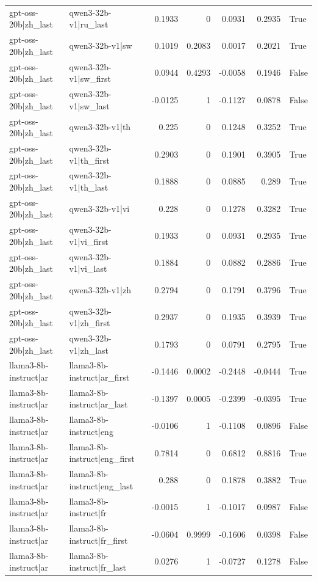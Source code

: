 \begin{table}
\begin{tabular}{l l r r r r l}
gpt-oss-20b|zh_last & qwen3-32b-v1|ru_last & 0.1933 & 0 & 0.0931 & 0.2935 & True \\
gpt-oss-20b|zh_last & qwen3-32b-v1|sw & 0.1019 & 0.2083 & 0.0017 & 0.2021 & True \\
gpt-oss-20b|zh_last & qwen3-32b-v1|sw_first & 0.0944 & 0.4293 & -0.0058 & 0.1946 & False \\
gpt-oss-20b|zh_last & qwen3-32b-v1|sw_last & -0.0125 & 1 & -0.1127 & 0.0878 & False \\
gpt-oss-20b|zh_last & qwen3-32b-v1|th & 0.225 & 0 & 0.1248 & 0.3252 & True \\
gpt-oss-20b|zh_last & qwen3-32b-v1|th_first & 0.2903 & 0 & 0.1901 & 0.3905 & True \\
gpt-oss-20b|zh_last & qwen3-32b-v1|th_last & 0.1888 & 0 & 0.0885 & 0.289 & True \\
gpt-oss-20b|zh_last & qwen3-32b-v1|vi & 0.228 & 0 & 0.1278 & 0.3282 & True \\
gpt-oss-20b|zh_last & qwen3-32b-v1|vi_first & 0.1933 & 0 & 0.0931 & 0.2935 & True \\
gpt-oss-20b|zh_last & qwen3-32b-v1|vi_last & 0.1884 & 0 & 0.0882 & 0.2886 & True \\
gpt-oss-20b|zh_last & qwen3-32b-v1|zh & 0.2794 & 0 & 0.1791 & 0.3796 & True \\
gpt-oss-20b|zh_last & qwen3-32b-v1|zh_first & 0.2937 & 0 & 0.1935 & 0.3939 & True \\
gpt-oss-20b|zh_last & qwen3-32b-v1|zh_last & 0.1793 & 0 & 0.0791 & 0.2795 & True \\
llama3-8b-instruct|ar & llama3-8b-instruct|ar_first & -0.1446 & 0.0002 & -0.2448 & -0.0444 & True \\
llama3-8b-instruct|ar & llama3-8b-instruct|ar_last & -0.1397 & 0.0005 & -0.2399 & -0.0395 & True \\
llama3-8b-instruct|ar & llama3-8b-instruct|eng & -0.0106 & 1 & -0.1108 & 0.0896 & False \\
llama3-8b-instruct|ar & llama3-8b-instruct|eng_first & 0.7814 & 0 & 0.6812 & 0.8816 & True \\
llama3-8b-instruct|ar & llama3-8b-instruct|eng_last & 0.288 & 0 & 0.1878 & 0.3882 & True \\
llama3-8b-instruct|ar & llama3-8b-instruct|fr & -0.0015 & 1 & -0.1017 & 0.0987 & False \\
llama3-8b-instruct|ar & llama3-8b-instruct|fr_first & -0.0604 & 0.9999 & -0.1606 & 0.0398 & False \\
llama3-8b-instruct|ar & llama3-8b-instruct|fr_last & 0.0276 & 1 & -0.0727 & 0.1278 & False \\

\end{tabular}
\end{table}
